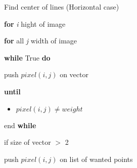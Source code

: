 \documentclass[../Head/Main.tex]{subfiles}
\begin{document}
\begin{Pseudo}{Find center of lines (Horizontal case)}{}

 	\textbf{for} \textit{i} hight of image 
	\begin{Indentation}
		\item 
	\begin{Indentation}
	\item \textbf{for} all \textit{j} width of image 
	\item \textbf{while} True \textbf{do}
	\item push $pixel(i,j)$ on vector
	
	\item \textbf{until}
				
	\begin{itemize}
	\item $pixel(i,j) \neq weight$  
	\end{itemize}
	
	\item end \textbf{while} 
	
	\item if size of vector $>$ 2
	\item push $pixel(i,j)$ on list of wanted points
	\end{Indentation}
	
	\end{Indentation}

	
\end{Pseudo} 
\end{document}
